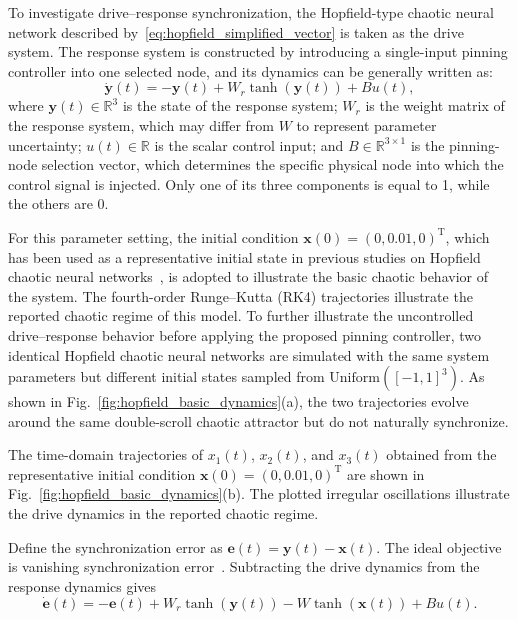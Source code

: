 \documentclass[a4paper,fleqn]{cas-sc}
\theoremstyle{plain}
\theoremstyle{definition}
\begin{document}
To investigate drive--response synchronization, the Hopfield-type chaotic neural network described by~\eqref{eq:hopfield_simplified_vector} is taken as the drive system. The response system is constructed by introducing a single-input pinning controller into one selected node, and its dynamics can be generally written as:
\begin{equation}
	\dot{\mathbf{y}}(t) = -\mathbf{y}(t) + W_r \tanh(\mathbf{y}(t)) + B u(t),
	\label{eq:response_system}
\end{equation}
where $\mathbf{y}(t) \in \mathbb{R}^3$ is the state of the response system; $W_r$ is the weight matrix of the response system, which may differ from $W$ to represent parameter uncertainty; $u(t) \in \mathbb{R}$ is the scalar control input; and $B \in \mathbb{R}^{3 \times 1}$ is the pinning-node selection vector, which determines the specific physical node into which the control signal is injected. Only one of its three components is equal to 1, while the others are 0.

For this parameter setting, the initial condition 
$\mathbf{x}(0)=(0,0.01,0)^{\mathrm T}$, which has been used as a representative initial state in previous studies on Hopfield chaotic neural networks~\cite{mahmoud2021analysis}, is adopted to illustrate the basic chaotic behavior of the system. The fourth-order Runge--Kutta (RK4) trajectories illustrate the reported chaotic regime of this model. To further illustrate the uncontrolled drive--response behavior before applying the proposed pinning controller, two identical Hopfield chaotic neural networks are simulated with the same system parameters but different initial states sampled from $\mathrm{Uniform} ([-1,1]^3)$. As shown in Fig.~\ref{fig:hopfield_basic_dynamics}(a), the two trajectories evolve around the same double-scroll chaotic attractor but do not naturally synchronize.

The time-domain trajectories of $x_1(t)$, $x_2(t)$, and $x_3(t)$ obtained from the representative initial condition $\mathbf{x}(0)=(0,0.01,0)^{\mathrm T}$ are shown in Fig.~\ref{fig:hopfield_basic_dynamics}(b). The plotted irregular oscillations illustrate the drive dynamics in the reported chaotic regime.

Define the synchronization error as $\mathbf{e}(t) = \mathbf{y}(t) - \mathbf{x}(t)$. The ideal objective is vanishing synchronization error~\cite{boccaletti2002synchronization}. Subtracting the drive dynamics from the response dynamics gives
\begin{equation}
	\dot{\mathbf{e}}(t) = -\mathbf{e}(t) + W_r \tanh(\mathbf{y}(t)) - W \tanh(\mathbf{x}(t)) + B u(t).
	\label{eq:error_system_exact}
\end{equation}
\end{document}
